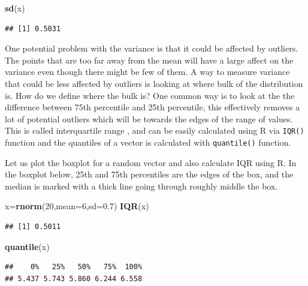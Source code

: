 \documentclass[12pt,]{krantz}
\newenvironment{Shaded}{\begin{snugshade}}{\end{snugshade}}
\newcommand{\DataTypeTok}[1]{\textcolor[rgb]{0.13,0.29,0.53}{#1}}
\newcommand{\DecValTok}[1]{\textcolor[rgb]{0.00,0.00,0.81}{#1}}
\newcommand{\FloatTok}[1]{\textcolor[rgb]{0.00,0.00,0.81}{#1}}
\newcommand{\KeywordTok}[1]{\textcolor[rgb]{0.13,0.29,0.53}{\textbf{#1}}}
\newcommand{\NormalTok}[1]{#1}
\theoremstyle{definition}
\theoremstyle{definition}
\theoremstyle{definition}
\theoremstyle{remark}
\begin{document}
\begin{Shaded}
\begin{Highlighting}[]
\KeywordTok{sd}\NormalTok{(x)}
\end{Highlighting}
\end{Shaded}

\begin{verbatim}
## [1] 0.5031
\end{verbatim}

One potential problem with the variance is that it could be affected by
outliers. The points that are too far away from the mean will have a
large affect on the variance even though there might be few of them. A
way to measure variance that could be less affected by outliers is
looking at where bulk of the distribution is. How do we define where the
bulk is? One common way is to look at the the difference between 75th
percentile and 25th percentile, this effectively removes a lot of
potential outliers which will be towards the edges of the range of
values. This is called interquartile range , and can be easily
calculated using R via \texttt{IQR()} function and the quantiles of a
vector is calculated with \texttt{quantile()} function.

Let us plot the boxplot for a random vector and also calculate IQR using
R. In the boxplot below, 25th and 75th percentiles are the edges of the
box, and the median is marked with a thick line going through roughly
middle the box.

\begin{Shaded}
\begin{Highlighting}[]
\NormalTok{x=}\KeywordTok{rnorm}\NormalTok{(}\DecValTok{20}\NormalTok{,}\DataTypeTok{mean=}\DecValTok{6}\NormalTok{,}\DataTypeTok{sd=}\FloatTok{0.7}\NormalTok{)}
\KeywordTok{IQR}\NormalTok{(x)}
\end{Highlighting}
\end{Shaded}

\begin{verbatim}
## [1] 0.5011
\end{verbatim}

\begin{Shaded}
\begin{Highlighting}[]
\KeywordTok{quantile}\NormalTok{(x)}
\end{Highlighting}
\end{Shaded}

\begin{verbatim}
##    0%   25%   50%   75%  100% 
## 5.437 5.743 5.860 6.244 6.558
\end{verbatim}
\end{document}
